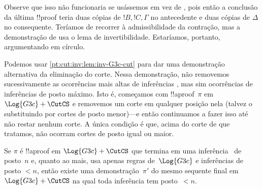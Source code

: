 \documentclass[../../../include/open-logic-section]{subfiles}
\begin{document}
Observe que isso não funcionaria se usássemos \Cut{} em vez de \CutCS, pois
então a conclusão da última !!{proof} teria duas cópias de
$!B, !C, \Gamma$ no antecedente e duas cópias de $\Delta$ no
consequente. Teríamos de recorrer à admissibilidade da
contração, mas a demonstração de  usa
o lema de invertibilidade. Estaríamos, portanto, argumentando em círculo.

Podemos usar \cref{pt:cut:inv:lem:inv-G3c-cut} para dar uma demonstração
alternativa da eliminação do corte. Nessa demonstração, não removemos
sucessivamente as ocorrências mais altas de inferências \CutCS{}, mas sim
ocorrências de inferências \CutCS{} de posto máximo. Isto é, começamos com
!!a{proof}~$\pi$ em $\Log{G3c} + \CutCS$ e removemos um corte em qualquer
posição nela (talvez o substituindo por cortes de posto menor)---e então
continuamos a fazer isso até não restar nenhum corte. A única condição é que,
acima do corte de que tratamos, não ocorram cortes de posto igual ou maior.

\begin{lem} Se $\pi$ é !!a{proof} em
$\Log{G3c}+\CutCS$ que termina em uma inferência~\CutCS{} de posto~$n$ e,
quanto ao mais, usa apenas regras de~$\Log{G3c}$ e inferências \CutCS{} de
posto $<n$, então existe uma demonstração~$\pi'$ do mesmo sequente final
em~$\Log{G3c} + \CutCS$ na qual toda inferência \CutCS{} tem posto~$<n$.
\end{lem}
\end{document}
